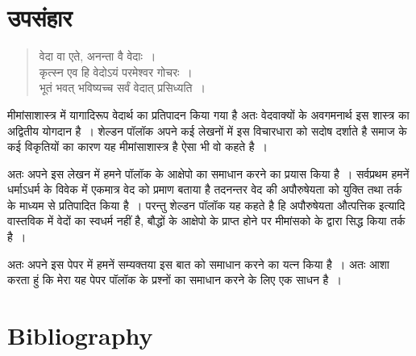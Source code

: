 \section*{उपसंहार}

\vskip 6pt

\begin{verse}
वेदा वा एते, अनन्ता वै वेदाः~।\\कृत्स्न एव हि वेदोऽयं परमेश्वर गोचरः~।\\भूतं भवत् भविष्यच्च सर्वं वेदात् प्रसिध्यति~।
\end{verse}

\vskip 6pt

मीमांसाशास्त्र में यागादिरूप वेदार्थ का प्रतिपादन किया गया है अतः वेदवाक्यों के अवगमनार्थ इस शास्त्र का अद्वितीय योगदान है~। शेल्डन पॉलॉक अपने कई लेखनों में इस विचारधारा को सदोष दर्शाते है समाज के कई विकृतियों का कारण यह मीमांसाशास्त्र है ऐसा भी वो कहते है~।

अतः अपने इस लेखन में हमने पॉलॉक के आक्षेपो का समाधान करने का प्रयास किया है~। सर्वप्रथम हमनें धर्माऽधर्म के विवेक में एकमात्र वेद को प्रमाण बताया है तदनन्तर वेद की अपौरुषेयता को युक्ति तथा तर्क के माध्यम से प्रतिपादित किया है~। परन्तु शेल्डन पॉलॉक यह कहते है हि अपौरुषेयता औत्पत्तिक इत्यादि वास्तविक में वेदों का स्वधर्म नहीं है, बौद्धों के आक्षेपो के प्राप्त होने पर मीमांसको के द्वारा सिद्ध किया तर्क है~। 

अतः अपने इस पेपर में हमनें सम्यक्तया इस बात को समाधान करने का यत्न किया है~। अतः आशा करता हुं कि मेरा यह पेपर पॉलॉक के प्रश्नों का समाधान करने के लिए एक साधन है~।


\bgroup

\selecteng

\section*{Bibliography}

\retainauthsanskrit

